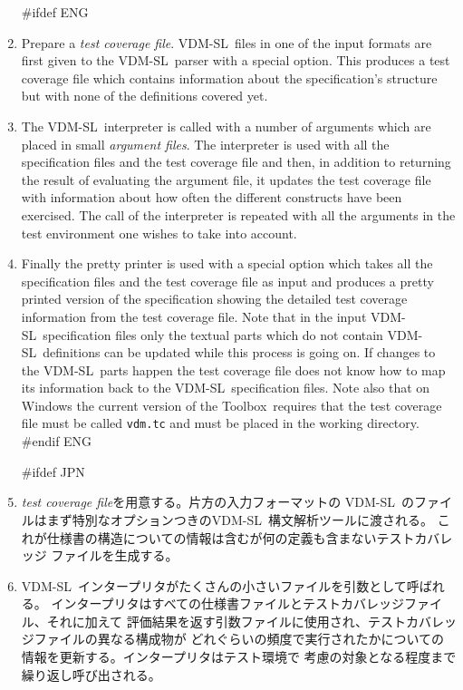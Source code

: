 \documentclass[\pformat,12pt]{article}
\newcommand{\vdmslpp}{VDM-SL}
\newcommand{\Toolbox}{Toolbox}
\newcommand{\vdmslpp}{VDM++}
\newcommand{\Toolbox}{Toolbox}
\begin{document}
\begin{enumerate}

#ifdef ENG
\item Prepare a {\em test coverage file}.
  \vdmslpp\ files in one of the input formats are first given to the
  \vdmslpp\ parser with a special option. This produces a test
  coverage file which contains information about the specification's
  structure but with none of the  definitions covered yet.

\item The \vdmslpp\ interpreter is called with a number of arguments
   which are placed in small {\em argument files\/}. The interpreter is used
  with all the specification files and the test coverage file and
  then, in addition to returning the result of evaluating the argument
  file, it updates the test coverage file with information about how
  often the different constructs have been exercised. The call of the
  interpreter is repeated with all the arguments in the test
  environment one wishes to take into account.
  
\item Finally the pretty printer is used with a special option which
  takes all the specification files and the test coverage file as
  input and 
  produces a pretty printed version of the specification showing the
  detailed test coverage information from the test coverage file.
  Note that in the input \vdmslpp\ specification files only the
  textual parts which do not contain \vdmslpp\ definitions can be
  updated while this process is going on. If changes to the \vdmslpp\ 
  parts happen the test coverage file does not know how to map its
  information back to the \vdmslpp\ specification files. Note also that on
  Windows the current version of the \Toolbox\ requires that the test
  coverage file must be called \texttt{vdm.tc} and must be
  placed in the working directory.
#endif ENG

#ifdef JPN
\item
  {\em test coverage file}を用意する。片方の入力フォーマットの
  \vdmslpp\ のファイルはまず特別なオプションつきの\vdmslpp\ 構文解析ツールに渡される。
  これが仕様書の構造についての情報は含むが何の定義も含まないテストカバレッジ
  ファイルを生成する。

\item
  \vdmslpp\ インタープリタがたくさんの小さいファイルを引数として呼ばれる。
  インタープリタはすべての仕様書ファイルとテストカバレッジファイル、それに加えて
  評価結果を返す引数ファイルに使用され、テストカバレッジファイルの異なる構成物が
  どれぐらいの頻度で実行されたかについての情報を更新する。インタープリタはテスト環境で
  考慮の対象となる程度まで繰り返し呼び出される。
  

\end{enumerate}
\end{document}
